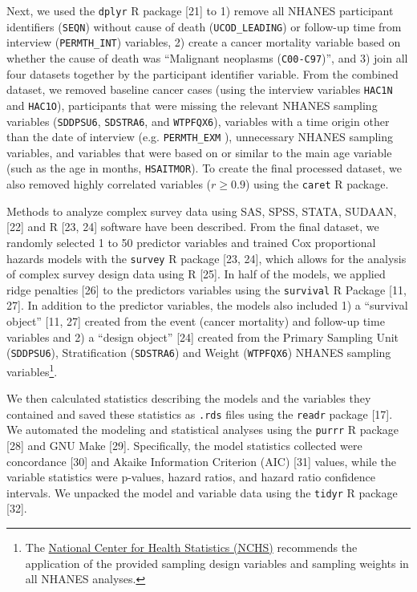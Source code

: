 \documentclass[12pt,oneside]{reedthesis}
\theoremstyle{definition}
\theoremstyle{definition}
\theoremstyle{definition}
\theoremstyle{remark}
\begin{document}
Next, we used the \texttt{dplyr} R package {[}21{]} to 1) remove all
NHANES participant identifiers (\texttt{SEQN}) without cause of death
(\texttt{UCOD\_LEADING}) or follow-up time from interview
(\texttt{PERMTH\_INT}) variables, 2) create a cancer mortality variable
based on whether the cause of death was ``Malignant neoplasms
(\texttt{C00-C97})'', and 3) join all four datasets together by the
participant identifier variable. From the combined dataset, we removed
baseline cancer cases (using the interview variables \texttt{HAC1N} and
\texttt{HAC1O}), participants that were missing the relevant NHANES
sampling variables (\texttt{SDDPSU6}, \texttt{SDSTRA6}, and
\texttt{WTPFQX6}), variables with a time origin other than the date of
interview (e.g. \texttt{PERMTH\_EXM} ), unnecessary NHANES sampling
variables, and variables that were based on or similar to the main age
variable (such as the age in months, \texttt{HSAITMOR}). To create the
final processed dataset, we also removed highly correlated variables
(\(r \geq 0.9\)) using the \texttt{caret} R package.

Methods to analyze complex survey data using SAS, SPSS, STATA, SUDAAN,
{[}22{]} and R {[}23, 24{]} software have been described. From the final
dataset, we randomly selected 1 to 50 predictor variables and trained
Cox proportional hazards models with the \texttt{survey} R package
{[}23, 24{]}, which allows for the analysis of complex survey design
data using R {[}25{]}. In half of the models, we applied ridge penalties
{[}26{]} to the predictors variables using the \texttt{survival} R
Package {[}11, 27{]}. In addition to the predictor variables, the models
also included 1) a ``survival object'' {[}11, 27{]} created from the
event (cancer mortality) and follow-up time variables and 2) a ``design
object'' {[}24{]} created from the Primary Sampling Unit
(\texttt{SDDPSU6}), Stratification (\texttt{SDSTRA6}) and Weight
(\texttt{WTPFQX6}) NHANES sampling variables\footnote{The
  \href{https://www.cdc.gov/nchs/tutorials/NHANES/SurveyDesign/SampleDesign/intro_iii.htm}{National
  Center for Health Statistics (NCHS)} recommends the application of the
  provided sampling design variables and sampling weights in all NHANES
  analyses.}.

We then calculated statistics describing the models and the variables
they contained and saved these statistics as \texttt{.rds} files using
the \texttt{readr} package {[}17{]}. We automated the modeling and
statistical analyses using the \texttt{purrr} R package {[}28{]} and GNU
Make {[}29{]}. Specifically, the model statistics collected were
concordance {[}30{]} and Akaike Information Criterion (AIC) {[}31{]}
values, while the variable statistics were p-values, hazard ratios, and
hazard ratio confidence intervals. We unpacked the model and variable
data using the \texttt{tidyr} R package {[}32{]}.
\end{document}

